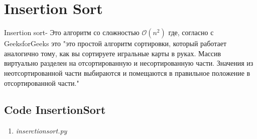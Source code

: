 
\section{Insertion Sort}

Insertion sort- Это алгоритм со сложностью \(\mathcal{O}(n^2)\) где, согласно с
GeeksforGeeks это \cite{geek} "это простой алгоритм сортировки,
который работает аналогично тому, как вы сортируете игральные карты в руках.
Массив виртуально разделен на отсортированную и несортированную части.
Значения из неотсортированной части выбираются и помещаются
в правильное положение в отсортированной части."

\subsection{Code InsertionSort}
\singlespace

\begin{enumerate}
  \item \textit{inserctionsort.py}

  

\end{enumerate}
